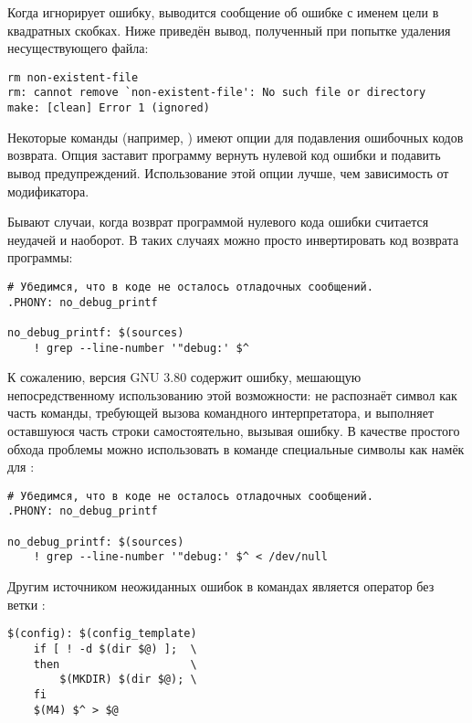 Когда \GNUmake{} игнорирует ошибку, выводится сообщение об ошибке с
именем цели в квадратных скобках. Ниже приведён вывод, полученный при
попытке удаления несуществующего файла:

{\footnotesize
\begin{verbatim}
rm non-existent-file
rm: cannot remove `non-existent-file': No such file or directory
make: [clean] Error 1 (ignored)
\end{verbatim}
}

Некоторые команды (например, ) имеют опции для подавления
ошибочных кодов возврата. Опция  заставит программу
 вернуть нулевой код ошибки и подавить вывод
предупреждений. Использование этой опции лучше, чем зависимость от
модификатора.

Бывают случаи, когда возврат программой нулевого кода ошибки считается
неудачей и наоборот. В таких случаях можно просто инвертировать код
возврата программы:

{\footnotesize
\begin{verbatim}
# Убедимся, что в коде не осталось отладочных сообщений.
.PHONY: no_debug_printf

no_debug_printf: $(sources)
    ! grep --line-number '"debug:' $^
\end{verbatim}
}

К сожалению, версия GNU \GNUmake{} 3.80 содержит ошибку, мешающую
непосредственному использованию этой возможности: \GNUmake{} не
распознаёт символ \command{!} как часть команды, требующей вызова
командного интерпретатора, и выполняет оставшуюся часть строки
самостоятельно, вызывая ошибку. В качестве простого обхода проблемы
можно использовать в команде специальные символы как намёк для
\GNUmake{}:

{\footnotesize
\begin{verbatim}
# Убедимся, что в коде не осталось отладочных сообщений.
.PHONY: no_debug_printf

no_debug_printf: $(sources)
    ! grep --line-number '"debug:' $^ < /dev/null
\end{verbatim}
}

Другим источником неожиданных ошибок в командах является оператор
 без ветки :

{\footnotesize
\begin{verbatim}
$(config): $(config_template)
    if [ ! -d $(dir $@) ];  \
    then                    \
        $(MKDIR) $(dir $@); \
    fi
    $(M4) $^ > $@
\end{verbatim}
}

